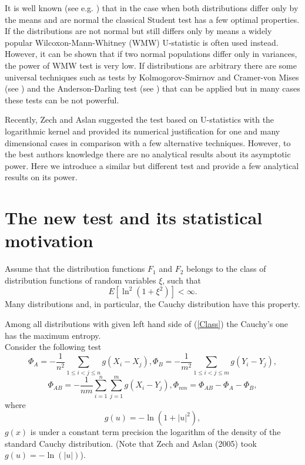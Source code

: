 \documentclass{svproc}
\begin{document}
It is well known (see e.g. \cite{Lehman1986}) that in the case when both distributions differ only by the means and are normal the classical Student test has a few optimal properties. If the distributions are not normal but still differs only by means a widely popular Wilcoxon-Mann-Whitney (WMW) U-statistic is often used instead. However, it can be shown that if two normal populations differ only in variances, the power of WMW test is very low.
If distributions are arbitrary there are some universal techniques such as tests by Kolmogorov-Smirnov and Cramer-von Mises  (see \cite{Buening2001}) and the Anderson-Darling test (see \cite{Anderson2011}) that can be applied but in many cases these tests can be not powerful.

Recently, Zech and Aslan  \cite{AslanZech2005} suggested the test based on U-statistics with the logarithmic kernel and provided its numerical justification for one and many dimensional cases in comparison with a few alternative techniques.  However, to the best authors knowledge there are no analytical results about its asymptotic power. Here we introduce a similar but different test and provide a few analytical results on its power.





\section{The new test and its statistical motivation}

Assume that the distribution functions
$F_1$ and $F_2$ belongs to the class of distribution functions of random variables  $\xi$, such that
\begin {equation}\label{Class}
E [\ln^2 (1+ \xi^2)     ] < \infty.
\end{equation}
Many distributions and, in particular, the Cauchy distribution have this property.
 \bigskip

Among all distributions with given left hand side of (\ref{Class}) the Cauchy's one has the maximum entropy.\\


Consider the following test
\begin{equation}\label{K}
 \Phi_{A}=-\frac{1}{n^2}\sum_{1\leq i<j\leq n} g(X_i-X_j),
\Phi_{B}=-\frac{1}{m^2}\sum_{1\leq i<j\leq m} g(Y_i-Y_j),
\end{equation}
\begin{equation}\label{K1}
\Phi_{AB}=-\frac{1}{nm}\sum_{i=1}^n\sum_{j=1}^m g(X_i-Y_j),
\Phi_{nm}=\Phi_{AB}-\Phi_{A}- \Phi_{B},
\end{equation}
where
$$
g(u)= -\ln (1+|u|^2),
$$
$g(x)$ is under a constant term precision the logarithm of the density of the standard Cauchy distribution.
(Note that Zech and Aslan (2005) took $g(u)= -\ln(|u|)$).
\end{document}
